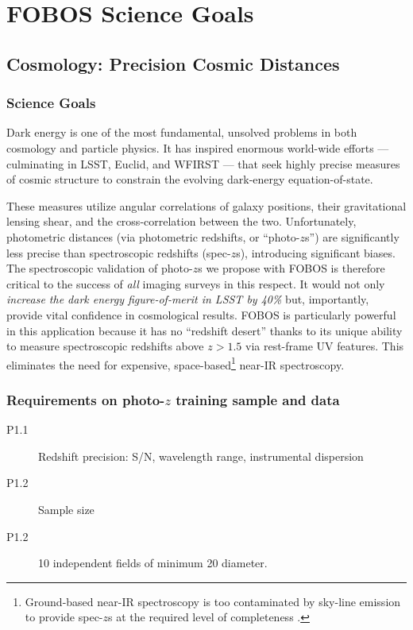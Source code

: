 \documentclass[preprint,11pt]{aastex}
\begin{document}
\section{FOBOS Science Goals} \label{sec:key_science}

\subsection{Cosmology: Precision Cosmic Distances}
\label{sec:cosmology}

\subsubsection{Science Goals}

Dark energy is one of
the most fundamental, unsolved problems in both cosmology and particle
physics.  It has inspired enormous world-wide efforts --- culminating in
LSST, Euclid, and WFIRST --- that seek highly precise measures of cosmic
structure to constrain the evolving dark-energy equation-of-state.

These measures utilize angular correlations of galaxy positions, their
gravitational lensing shear, and the cross-correlation between the two.
Unfortunately, photometric distances (via photometric redshifts, or
``photo-$z$s'') are significantly less precise than spectroscopic
redshifts (spec-$z$s), introducing significant biases.  The
spectroscopic validation of photo-$z$s we propose with FOBOS is
therefore critical to the success of {\it all} imaging surveys in this
respect. It would not only \emph{increase the dark energy
figure-of-merit in LSST by 40\%} \citep{newman15} but, importantly,
provide vital confidence in cosmological results.  FOBOS is particularly
powerful in this application because it has no ``redshift desert'' thanks to its unique ability to measure spectroscopic redshifts above $z > 1.5$ via
rest-frame UV features.  This eliminates the need for expensive, space-based\footnote{Ground-based near-IR
spectroscopy is too contaminated by sky-line emission to provide spec-$z$s at the required level of completeness
\citep{newman15}.} near-IR spectroscopy.

\subsubsection{Requirements on photo-$z$ training sample and data}

\begin{description}

\item[P1.1] Redshift precision: S/N, wavelength range, instrumental dispersion

\item[P1.2] Sample size 

\item[P1.2] 10 independent fields of minimum 20\arcmin{} diameter.

\end{description}
\end{document}
